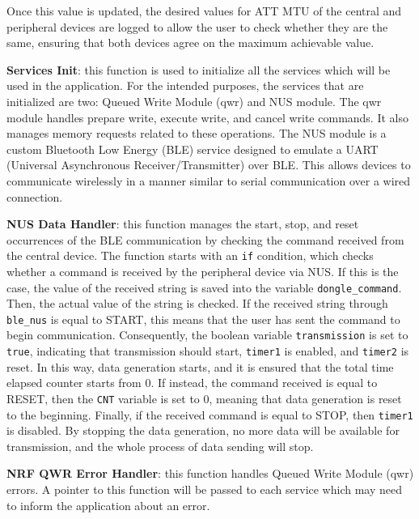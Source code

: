 \documentclass{Configuration_Files/PoliMi3i_thesis}
\begin{document}
Once this value is updated, the desired values for ATT MTU of the central and peripheral devices are logged to allow the user to check whether they are the same, ensuring that both devices agree on the maximum achievable value.

\textbf{Services Init}: this function is used to initialize all the services which will be used in the application. For the intended purposes, the services that are initialized are two: Queued Write Module (qwr) and NUS module. The qwr module handles prepare write, execute write, and cancel write commands. It also manages memory requests related to these operations. The NUS module is a custom Bluetooth Low Energy (BLE) service designed to emulate a UART (Universal Asynchronous Receiver/Transmitter) over BLE. This allows devices to communicate wirelessly in a manner similar to serial communication over a wired connection.

\textbf{NUS Data Handler}: this function manages the start, stop, and reset occurrences of the BLE communication by checking the command received from the central device. The function starts with an \texttt{if} condition, which checks whether a command is received by the peripheral device via NUS. If this is the case, the value of the received string is saved into the variable \texttt{dongle\_command}. Then, the actual value of the string is checked. If the received string through \texttt{ble\_nus} is equal to START, this means that the user has sent the command to begin communication. Consequently, the boolean variable \texttt{transmission} is set to \texttt{true}, indicating that transmission should start, \texttt{timer1} is enabled, and \texttt{timer2} is reset. In this way, data generation starts, and it is ensured that the total time elapsed counter starts from 0. If instead, the command received is equal to RESET, then the \texttt{CNT} variable is set to 0, meaning that data generation is reset to the beginning. Finally, if the received command is equal to STOP, then \texttt{timer1} is disabled. By stopping the data generation, no more data will be available for transmission, and the whole process of data sending will stop.


\textbf{NRF QWR Error Handler}: this function handles Queued Write Module (qwr) errors. A pointer to this function will be passed to each service which may need to inform the application about an error.
\end{document}
